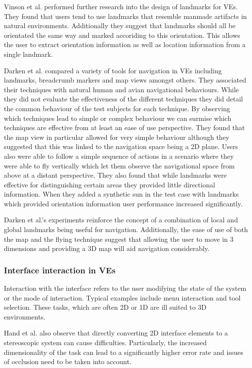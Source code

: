 \documentclass{sig-alternate-05-2015}
\begin{document}
Vinson et al. performed further research into the design of landmarks for VEs.\cite{Vinson1999} They found that users tend to use landmarks that resemble manmade artifacts in natural environments. Additionally they suggest that landmarks should all be orientated the same way and marked accoriding to this orientation. This allows the user to extract orientation information as well as location information from a single landmark.

Darken et al. compared a variety of tools for navigation in VEs including landmarks, breadcrumb markers and map views amongst others\cite{Darken1993}. They associated their techniques with natural human and avian  navigational behaviours. While they did not evaluate the effectiveness of the different techniques they did detail the common behaviour of the test subjects for each technique. By observing which techniques lead to simple or complex behaviour we can surmise which techniques are effective from at least an ease of use perspective. They found that the map view in particular allowed for very simple behaviour although they suggested that this was linked to the navigation space being a 2D plane. Users also were able to follow a simple sequence of actions in a scenario where they were able to fly vertically which let them observe the navigational space from above at a distant perspective. They also found that while landmarks were effective for distinguishing certain areas they provided little directional information. When they added a synthetic sun in the test case with landmarks which provided orientation information user performance increased significantly.

Darken et al.'s experiments reinforce the concept of a combination of local and global landmarks being useful for navigation.\cite{Darken1993} Additionally, the ease of use of both the map and the flying technique suggest that allowing the user to move in 3 dimensions and providing a 3D map will aid navigation considerably. 
\subsubsection{Interface interaction in VEs}
 Interaction with the interface refers to the user modifying the state of the system or the mode of interaction\cite{Bowman2001}. Typical examples include menu interaction and tool selection. These tasks, which are often 2D or 1D are ill suited to 3D environments\cite{Bowman2001, Hand1997}.
 
 Hand et al. also observe that directly converting 2D interface elements to a stereoscopic system can cause difficulties.\cite{Hand1997} Particularly, the increased dimensionality of the task can lead to a significantly higher error rate and issues of occlusion need to be taken into account.
 
\end{document}

